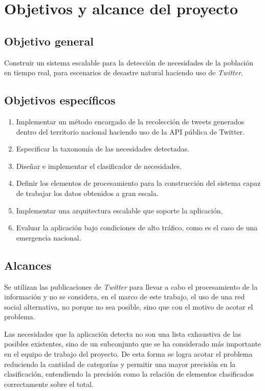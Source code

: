 \section{Objetivos y alcance del proyecto}
\label{intro:objetivos}

\subsection{Objetivo general}
	Construir un sistema escalable para la detección de necesidades de la población en tiempo real, para escenarios de desastre natural haciendo uso de \textit{Twitter}.

\subsection{Objetivos específicos}
\begin{enumerate}
\item	Implementar un método encargado de la recolección de tweets generados dentro del territorio nacional haciendo uso de la API pública de Twitter.
\item	Especificar la taxonomía de las necesidades detectadas.
\item	Diseñar e implementar el clasificador de necesidades.
\item	Definir los elementos de procesamiento para la construcción del sistema capaz de trabajar los datos obtenidos a gran escala.
\item	Implementar una arquitectura escalable que soporte la aplicación.
\item	Evaluar la aplicación bajo condiciones de alto tráfico, como es el caso de una emergencia nacional.
\end{enumerate}

\subsection{Alcances}
\label{subsec:alcances}

Se utilizan las publicaciones de \textit{Twitter} para llevar a cabo el procesamiento de la información y no se considera, en el marco de este trabajo, el uso de una red social alternativa, no porque no sea posible, sino que con el motivo de acotar el problema.

Las necesidades que la aplicación detecta no son una lista exhaustiva de las posibles existentes, sino de un subconjunto que se ha considerado más importante en el equipo de trabajo del proyecto. De esta forma se logra acotar el problema reduciendo la cantidad de categorías y permitir una mayor precisión en la clasificación, entendiendo la precisión como la relación de elementos clasificados correctamente sobre el total.

